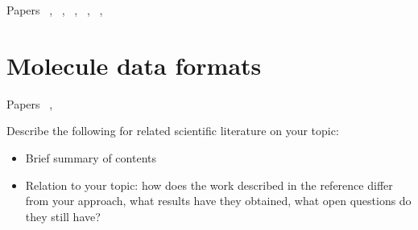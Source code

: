 Papers ~\cite{ertl2010molecular}, ~\cite{hanson2013jsmol}, ~\cite{bienfait2013jsme}, ~\cite{ekins2013tb}, ~\cite{fjeld2007tangible}, ~\cite{ertl2012molecule}


\section{Molecule data formats}

Papers ~\cite{daylight1992daylight}, ~\cite{heller2013inchi}





Describe the following for related scientific literature on your topic:
\begin{itemize}
\item Brief summary of contents
\item Relation to your topic: how does the work described in the reference differ from your approach, what results have they obtained, what open questions do they still have?
\end{itemize}
